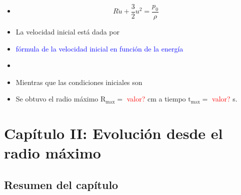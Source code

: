 \documentclass[aps,prb,twocolumn,superscriptaddress,floatfix,longbibliography,10pt]{revtex4-2}
\begin{document}
\begin{itemize}
  \item 
  \begin{equation}
    R \dot{u} + \frac{3}{2}u^2 = \frac{p_0}{\rho}
  \end{equation}


  \item La velocidad inicial está dada por 
  \item \textcolor{blue}{fórmula de la velocidad inicial en función de la energía}
  \item 
  \item Mientras que las condiciones iniciales son 
  \item Se obtuvo el radio máximo $\mathrm{R_{max}} = $ \textcolor{red}{valor?} cm a tiempo $\mathrm{t_{max}} = $ \textcolor{red}{valor?} s.
\end{itemize}






























\section*{Capítulo II: Evolución desde el radio máximo}

\subsection{Resumen del capítulo}
\end{document}
